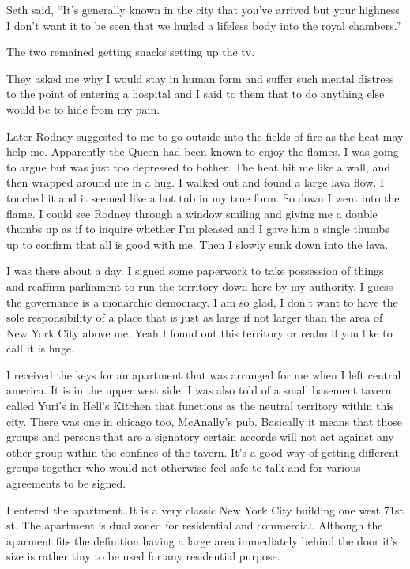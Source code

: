 Seth said, ``It's generally known in the city that you've arrived but your highness I don't want it to be seen that we hurled a lifeless body into the royal chambers.''

The two remained getting snacks setting up the tv.

They asked me why I would stay in human form and suffer such mental distress to the point of entering a hospital and I said to them that to do anything else would be to hide from my pain.

Later Rodney suggested to me to go outside into the fields of fire as the heat may help me. Apparently the Queen had been known to enjoy the flames. I was going to argue but was just too depressed to bother. The heat hit me like a wall, and then wrapped around me in a hug. I walked out and found a large lava flow. I touched it and it seemed like a hot tub in my true form. So down I went into the flame. I could see Rodney through a window smiling and giving me a double thumbs up as if to inquire whether I’m pleased and I gave him a single thumbs up to confirm that all is good with me. Then I slowly sunk down into the lava.

I was there about a day. I signed some paperwork to take possession of things and reaffirm parliament to run the territory down here by my authority. I guess the governance is a monarchic democracy. I am so glad, I don’t want to have the sole responsibility of a place that is just as large if not larger than the area of New York City above me. Yeah I found out this territory or realm if you like to call it is huge.

I received the keys for an apartment that was arranged for me when I left central america. It is in the upper west side. I was also told of a small basement tavern called Yuri’s in Hell’s Kitchen that functions as the neutral territory within this city. There was one in chicago too, McAnally’s pub. Basically it means that those groups and persons that are a signatory certain accords will not act against any other group within the confines of the tavern. It’s a good way of getting different groups together who would not otherwise feel safe to talk and for various agreements to be signed.

\parasep{}

I entered the apartment. It is a very classic New York City building one west 71st st. The apartment is dual zoned for residential and commercial. Although the aparment fits the definition having a large area immediately behind the door it’s size is rather tiny to be used for any residential purpose.

